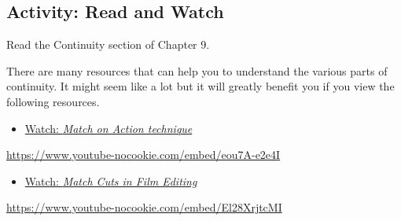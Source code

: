 \documentclass[
  letterpaper,
  DIV=11,
  numbers=noendperiod]{scrreprt}
\providecommand{\tightlist}{%
  \setlength{\itemsep}{0pt}\setlength{\parskip}{0pt}}\usepackage{longtable,booktabs,array}
\begin{document}
\subsection{Activity: Read and Watch}\label{activity-read-and-watch-1}

\begin{tcolorbox}[enhanced jigsaw, titlerule=0mm, leftrule=.75mm, bottomrule=.15mm, colback=white, left=2mm, opacitybacktitle=0.6, title={Learning Activity}, colbacktitle=quarto-callout-note-color!10!white, colframe=quarto-callout-note-color-frame, bottomtitle=1mm, toptitle=1mm, opacityback=0, rightrule=.15mm, breakable, arc=.35mm, toprule=.15mm, coltitle=black]

Read the Continuity section of Chapter 9.

There are many resources that can help you to understand the various
parts of continuity. It might seem like a lot but it will greatly
benefit you if you view the following resources.

\begin{itemize}
\tightlist
\item
  \href{https://www.youtube.com/watch?v=eou7A-e2e4I}{Watch: \emph{Match
  on Action technique}}
\end{itemize}

\url{https://www.youtube-nocookie.com/embed/eou7A-e2e4I}

\begin{itemize}
\tightlist
\item
  \href{https://www.youtube.com/watch?v=El28XrjtcMI}{Watch: \emph{Match
  Cuts in Film Editing}}
\end{itemize}

\url{https://www.youtube-nocookie.com/embed/El28XrjtcMI}

\end{tcolorbox}
\end{document}
